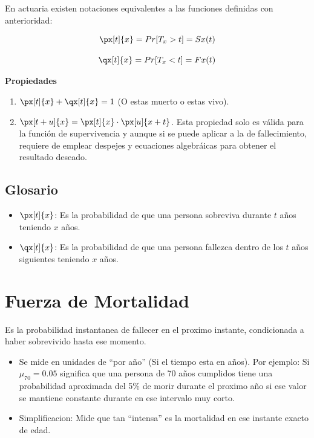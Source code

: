 \documentclass[12pt, a4paper, footinclude=true]{scrbook}
\begin{document}
En actuaria existen notaciones equivalentes a las funciones definidas con anterioridad: 

$$ \px[t]{x} = Pr[T_x > t] = Sx(t)$$

$$ \qx[t]{x} = Pr[T_x < t] = Fx(t)$$

\textbf{Propiedades}

\begin{enumerate}
	\item $\px[t]{x} + \qx[t]{x} = 1$ (O estas muerto o estas vivo). 
	\item $\px[t+u]{x} = \px[t]{x} \cdot \px[u]{x+t}$.
	\subitem Esta propiedad solo es válida para la función de supervivencia y aunque si se puede aplicar a la de fallecimiento, requiere de emplear despejes y ecuaciones algebráicas para obtener el resultado deseado. 
\end{enumerate}

\subsection{Glosario}

\begin{itemize}
	\item $\px[t]{x}$: Es la probabilidad de que una persona sobreviva durante $t$ años teniendo $x$ años. 
	\item $\qx[t]{x}$: Es la probabilidad de que una persona fallezca dentro de los $t$ años siguientes teniendo $x$ años. 
\end{itemize}

\section{Fuerza de Mortalidad}

Es la probabilidad instantanea de fallecer en el proximo instante, condicionada a haber sobrevivido hasta ese momento. 

\begin{itemize}
	\item Se mide en unidades de ``por año'' (Si el tiempo esta en años). Por ejemplo: Si $\mu_{70} = 0.05$ significa que una persona de 70 años cumplidos tiene una probabilidad aproximada del 5\% de morir durante el proximo año si ese valor se mantiene constante durante en ese intervalo muy corto. 
	\item Simplificacion: Mide que tan ``intensa'' es la mortalidad en ese instante exacto de edad. 
\end{itemize}
\end{document}
